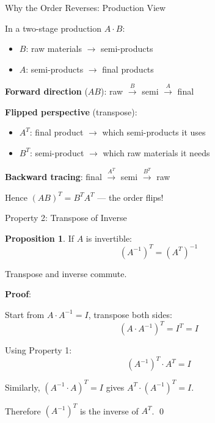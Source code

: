 \documentclass[10pt]{beamer}
\theoremstyle{definition}
\newtheorem{prop}{Proposition}[section]
\newcommand{\x}[1]{\alert{\textbf{#1}}}
\begin{document}
\begin{frame}{Why the Order Reverses: Production View}

In a two-stage production $A \cdot B$:

\vspace{0.5em}

\begin{itemize}
\item $B$: raw materials $\to$ semi-products
\item $A$: semi-products $\to$ final products
\end{itemize}

\vspace{1em}

\x{Forward direction} ($AB$): raw $\xrightarrow{B}$ semi $\xrightarrow{A}$ final

\vspace{1em}

\x{Flipped perspective} (transpose):
\begin{itemize}
\item $A^T$: final product $\to$ which semi-products it uses
\item $B^T$: semi-product $\to$ which raw materials it needs
\end{itemize}

\vspace{1em}

\x{Backward tracing}: final $\xrightarrow{A^T}$ semi $\xrightarrow{B^T}$ raw

\vspace{1em}

Hence $(AB)^T = B^T A^T$ — the order flips!

\end{frame}

\begin{frame}{Property 2: Transpose of Inverse}

\begin{prop}
If $A$ is invertible:
$$(A^{-1})^T = (A^T)^{-1}$$

Transpose and inverse commute.
\end{prop}

\vspace{1em}

\x{Proof}:

Start from $A \cdot A^{-1} = I$, transpose both sides:
$$(A \cdot A^{-1})^T = I^T = I$$

Using Property 1:
$$(A^{-1})^T \cdot A^T = I$$

Similarly, $(A^{-1} \cdot A)^T = I$ gives $A^T \cdot (A^{-1})^T = I$.

Therefore $(A^{-1})^T$ is the inverse of $A^T$. \qed

\end{frame}
\end{document}

